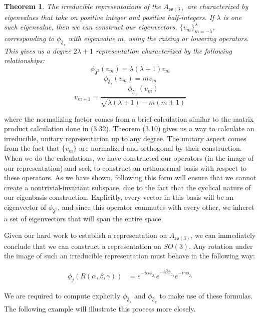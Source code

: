 \documentclass[10pt]{ucthesis}
\newtheorem{theorem}[definition]{Theorem}
\begin{document}
\begin{theorem}
	The irreducible representations of the $A_{\mathfrak{so}(3)}$ are characterized by eigenvalues that take on positive integer and positive half-integers. If $\lambda$ is one such eigenvalue, then we can construct our eigenvectors, $\{v_m\}_{m=-\lambda}^\lambda$, corresponding to $\phi_{\mathfrak{J}_z}$ with eigenvalue $m$, using the raising or lowering operators. This gives us a degree $2\lambda +1$ representation characterized by the following relationships:
$$\phi_{\mathfrak{J}^2}(v_m) = \lambda(\lambda+1)v_m$$
$$\phi_{\mathfrak{J}_z}(v_m) =  mv_m$$ 
$$v_{m+1} =  \frac{\phi_{\mathfrak{J}_\pm}(v_m)}{\sqrt{\lambda(\lambda+1) - m(m\pm 1)}}$$
\end{theorem}
\noindent where the normalizing factor comes from a brief calculation similar to the matrix product calculation done in (3.32). Theorem (3.10) gives us a way to calculate an irreducible, unitary representation up to any degree. The unitary aspect comes from the fact that $\{v_m\}$ are normalized and orthogonal by their construction. When we do the calculations, we have constructed our operators (in the image of our representation) and seek to construct an orthonormal basis with respect to these operators. As we have shown, following this form will ensure that we cannot create a nontrivial-invariant subspace, due to the fact that the cyclical nature of our eigenbasis construction. Explicitly, every vector in this basis will be an eigenvector of $\phi_{\mathfrak{J^2}}$, and since this operator commutes with every other, we inheret a set of eigenvectors that will span the entire space.

Given our hard work to establish a representation on $A_{\mathfrak{so}(3)}$, we can immediately conclude that we can construct a representation on $SO(3)$. Any rotation under the image of such an irreducible representation must behave in the following way:

\begin{equation}
\begin{aligned}
	\phi_j(R(\alpha,\beta,\gamma)) &= e^{-i\alpha\phi_{\mathfrak{J}_z}}e^{-i\beta\phi_{\mathfrak{J}_y}}e^{-i\gamma\phi_{\mathfrak{J}_z}}	
\end{aligned}
\end{equation}

We are required to compute explicitly $\phi_{\mathfrak{J}_z}$ and $\phi_{\mathfrak{J}_y}$ to make use of these formulas. The following example will illustrate this process more closely.
\end{document}
